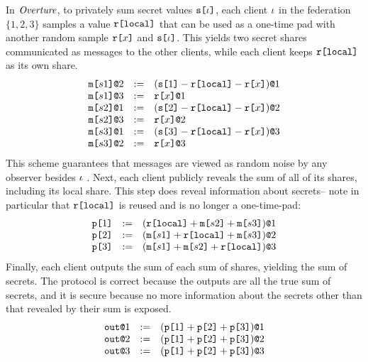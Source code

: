 In $\mathit{Overture}$, to privately sum secret values $\texttt{s[}\iota\texttt{]}$, each
client $\iota$ in the federation $\{ 1, 2, 3 \}$ samples a value
$\texttt{r[}\mathtt{local}\texttt{]}$ that can be used as a one-time pad with another random
sample $\texttt{r[}x\texttt{]}$ and $\texttt{s[}\iota\texttt{]}$. This yields two secret shares
communicated as messages to the other clients, while each client keeps
$\texttt{r[}\mathtt{local}\texttt{]}$ as its own share.
$$
\begin{array}{lll}
  \texttt{m[}s1\texttt{]}\texttt{@}2 &:=& (\texttt{s[}1\texttt{]} - \texttt{r[}\mathtt{local}\texttt{]} - \texttt{r[}x\texttt{]})\texttt{@}1 \\ 
  \texttt{m[}s1\texttt{]}\texttt{@}3 &:=& \texttt{r[}x\texttt{]}\texttt{@}1 \\ 
  \texttt{m[}s2\texttt{]}\texttt{@}1 &:=& (\texttt{s[}2\texttt{]} - \texttt{r[}\mathtt{local}\texttt{]} - \texttt{r[}x\texttt{]})\texttt{@}2 \\ 
  \texttt{m[}s2\texttt{]}\texttt{@}3 &:=& \texttt{r[}x\texttt{]}\texttt{@}2 \\ 
  \texttt{m[}s3\texttt{]}\texttt{@}1 &:=& (\texttt{s[}3\texttt{]} - \texttt{r[}\mathtt{local}\texttt{]} - \texttt{r[}x\texttt{]})\texttt{@}3 \\ 
  \texttt{m[}s3\texttt{]}\texttt{@}2 &:=& \texttt{r[}x\texttt{]}\texttt{@}3
\end{array}
$$
This scheme guarantees that messages
are viewed as random noise by any observer 
besides $\iota$ \cite{barthe2019probabilistic}. Next, each client
publicly reveals the sum of all of its shares, including its local
share. This step does reveal information about secrets-- note in
particular that $\texttt{r[}\mathtt{local}\texttt{]}$ is reused and is no longer a one-time-pad:
$$
\begin{array}{lll}
  \texttt{p[}1\texttt{]} &:=& (\texttt{r[}\mathtt{local}\texttt{]} + \texttt{m[}s2\texttt{]} + \texttt{m[}s3\texttt{]})\texttt{@}1 \\ 
  \texttt{p[}2\texttt{]} &:=& (\texttt{m[}s1\texttt{]} + \texttt{r[}\mathtt{local}\texttt{]} + \texttt{m[}s3\texttt{]})\texttt{@}2 \\
  \texttt{p[}3\texttt{]} &:=& (\texttt{m[}s1\texttt{]} + \texttt{m[}s2\texttt{]} + \texttt{r[}\mathtt{local}\texttt{]})\texttt{@}3 
\end{array}
$$
Finally, each client outputs the sum of each sum of shares, yielding
the sum of secrets. The protocol is correct because the outputs are all the
true sum of secrets, and it is secure because no more information about the
secrets other than that revealed by their sum is exposed.
$$
\begin{array}{lll}
  \texttt{out}\texttt{@}1 &:=& (\texttt{p[}1\texttt{]} + \texttt{p[}2\texttt{]} + \texttt{p[}3\texttt{]})\texttt{@}1\\
  \texttt{out}\texttt{@}2 &:=& (\texttt{p[}1\texttt{]} + \texttt{p[}2\texttt{]} + \texttt{p[}3\texttt{]})\texttt{@}2\\
  \texttt{out}\texttt{@}3 &:=& (\texttt{p[}1\texttt{]} + \texttt{p[}2\texttt{]} + \texttt{p[}3\texttt{]})\texttt{@}3
\end{array}
$$
